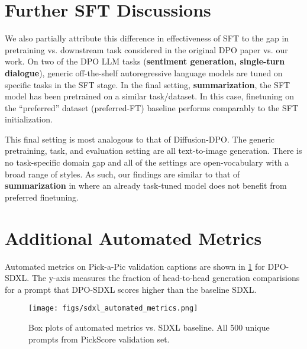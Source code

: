 \documentclass[10pt,twocolumn,letterpaper]{article}
\begin{document}
\section{Further SFT Discussions}\label{sec:supp_sft}

We also partially attribute this difference in effectiveness of SFT to the gap in pretraining vs. downstream task considered in the original DPO paper \cite{rafailov2023direct} vs. our work. 
On two of the DPO LLM tasks (\textbf{sentiment generation, single-turn dialogue}), generic off-the-shelf autoregressive language models are tuned on specific tasks in the SFT stage. In the final setting, \textbf{summarization}, the SFT model has been pretrained on a similar task/dataset. In this case, finetuning on the ``preferred'' dataset (preferred-FT) baseline performs comparably to the SFT initialization.

This final setting is most analogous to that of Diffusion-DPO. The generic pretraining, task, and evaluation setting are all text-to-image generation. There is no task-specific domain gap and all of the settings are open-vocabulary with a broad range of styles. As such, our findings are similar to that of \textbf{summarization} in \cite{rafailov2023direct} where an already task-tuned model does not benefit from preferred finetuning. 






\section{Additional Automated Metrics}\label{sec:supp_auto_metrics}

Automated metrics on Pick-a-Pic validation captions are shown in \cref{fig:t2i_automated_metrics} for DPO-SDXL. The y-axis measures the fraction of head-to-head generation comparisions for a prompt that DPO-SDXL scores higher than the baseline SDXL.

\begin{figure}[h]
  \centering
\texttt{[image: figs/sdxl\_automated\_metrics.png]}

   \caption{Box plots of automated metrics vs. SDXL baseline. All 500 unique prompts from PickScore validation set.
   }
   \label{fig:t2i_automated_metrics}
\end{figure}
\end{document}
